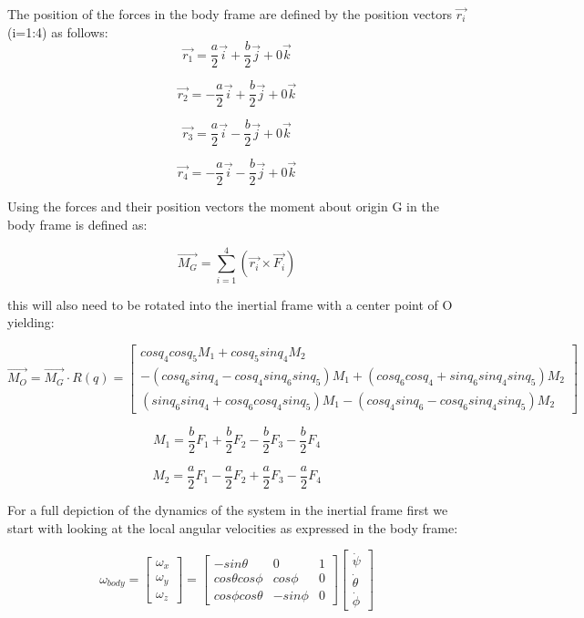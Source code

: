 \documentclass[10pt, letterpaper]{article}
\begin{document}
The position of the forces in the body frame are defined by the position
vectors $\overrightarrow{r_{i}}$ (i=1:4) as follows:
\[
\overrightarrow{r_{1}}=\frac{a}{2}\overrightarrow{i}+\frac{b}{2}\overrightarrow{j}+0\overrightarrow{k}
\]

\[
\overrightarrow{r_{2}}=-\frac{a}{2}\overrightarrow{i}+\frac{b}{2}\overrightarrow{j}+0\overrightarrow{k}
\]

\[
\overrightarrow{r_{3}}=\frac{a}{2}\overrightarrow{i}-\frac{b}{2}\overrightarrow{j}+0\overrightarrow{k}
\]

\[
\overrightarrow{r_{4}}=-\frac{a}{2}\overrightarrow{i}-\frac{b}{2}\overrightarrow{j}+0\overrightarrow{k}
\]

Using the forces and their position vectors the moment about origin
G in the body frame is defined as:

\[
\overrightarrow{M_{G}}=\sum_{i=1}^{4}(\overrightarrow{r_{i}}\times\overrightarrow{F_{i}})
\]

this will also need to be rotated into the inertial frame with a center point of O yielding:

\[
\overrightarrow{M_O} =
\overrightarrow{M_{G}} \cdot R(q)=\left[\begin{array}{c}
cosq_{4}cosq_{5}M_{1}+cosq_{5}sinq_{4}M_{2}\\
-(cosq_{6}sinq_{4}-cosq_{4}sinq_{6}sinq_{5})M_{1}+(cosq_{6}cosq_{4}+sinq_{6}sinq_{4}sinq_{5})M_{2}\\
(sinq_{6}sinq_{4}+cosq_{6}cosq_{4}sinq_{5})M_{1}-(cosq_{4}sinq_{6}-cosq_{6}sinq_{4}sinq_{5})M_{2}
\end{array}\right]
\]

\[
M_{1}=\frac{b}{2}F_{1}+\frac{b}{2}F_{2}-\frac{b}{2}F_{3}-\frac{b}{2}F_{4}
\]

\[
M_{2}=\frac{a}{2}F_{1}-\frac{a}{2}F_{2}+\frac{a}{2}F_{3}-\frac{a}{2}F_{4}
\]

For a full depiction of the dynamics of the system in the inertial frame
first we start with looking at the local angular velocities as expressed
in the body frame:

\[
\omega_{body}=\left[\begin{array}{c}
\omega_{x}\\
\omega_{y}\\
\omega_{z}
\end{array}\right]=\left[\begin{array}{ccc}
-sin\theta & 0 & 1\\
cos\theta cos\phi & cos\phi & 0\\
cos\phi cos\theta & -sin\phi & 0
\end{array}\right]\left[\begin{array}{c}
\dot{\psi}\\
\dot{\theta}\\
\dot{\phi}
\end{array}\right]
\]
\end{document}
